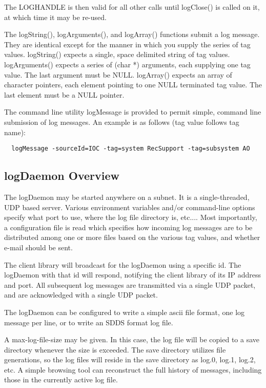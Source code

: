 \documentclass[11pt]{article}
\begin{document}
The LOGHANDLE is then valid for all other calls until logClose() is called on it, at which time it may be re-used.

The logString(), logArguments(), and logArray() functions submit a log message. They are identical except for the manner in which you supply the series of tag values. logString() expects a single, space delimited string of tag values. logArguments() expects a series of (char *) arguments, each supplying one tag value. The last argument must be NULL. logArray() expects an array of character pointers, each element pointing to one NULL terminated tag value. The last element must be a NULL pointer.

The command line utility logMessage is provided to permit simple, command line submission of log messages. An example is as follows (tag value follows tag name):

\begin{verbatim}
  logMessage -sourceId=IOC -tag=system RecSupport -tag=subsystem AO
\end{verbatim}

\subsection{logDaemon Overview}

 The logDaemon may be started anywhere on a subnet. It is a single-threaded, UDP based server. Various environment variables and/or command-line options specify what port to use, where the log file directory is, etc.... Most importantly, a configuration file is read which specifies how incoming log messages are to be distributed among one or more files based on the various tag values, and whether e-mail should be sent.

The client library will broadcast for the logDaemon using a specific id. The logDaemon with that id will respond, notifying the client library of its IP address and port. All subsequent log messages are transmitted via a single UDP packet, and are acknowledged with a single UDP packet.

The logDaemon can be configured to write a simple ascii file format, one log message per line, or to write an SDDS format log file.

A max-log-file-size may be given. In this case, the log file will be copied to a save directory whenever the size is exceeded. The save directory utilizes file generations, so the log files will reside in the save directory as log.0, log.1, log.2, etc. A simple browsing tool can reconstruct the full history of messages, including those in the currently active log file.
\end{document}
